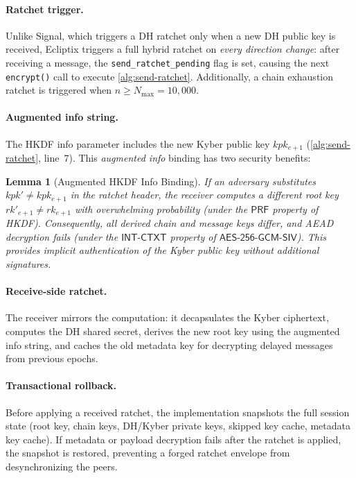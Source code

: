 \documentclass[11pt,a4paper]{article}
\newtheorem{lemma}[theorem]{Lemma}
\theoremstyle{definition}
\newcommand{\AEAD}{\textsf{AES-256-GCM-SIV}}
\newcommand{\INTCTXT}{\textsf{INT-CTXT}}
\newcommand{\PRF}{\textsf{PRF}}
\newcommand{\rk}{\mathit{rk}}
\begin{document}
\paragraph{Ratchet trigger.}
Unlike Signal, which triggers a DH ratchet only when a new DH public key is received, Ecliptix triggers a full hybrid ratchet on \emph{every direction change}: after receiving a message, the \texttt{send\_ratchet\_pending} flag is set, causing the next \texttt{encrypt()} call to execute \cref{alg:send-ratchet}. Additionally, a chain exhaustion ratchet is triggered when $n \geq N_{\max} = 10{,}000$.

\paragraph{Augmented info string.}
The HKDF info parameter includes the new Kyber public key $kpk_{e+1}$ (\cref{alg:send-ratchet}, line~7). This \emph{augmented info} binding has two security benefits:

\begin{lemma}[Augmented HKDF Info Binding]\label{lem:augmented-hkdf}
If an adversary substitutes $kpk' \neq kpk_{e+1}$ in the ratchet header, the receiver computes a different root key $\rk'_{e+1} \neq \rk_{e+1}$ with overwhelming probability (under the $\PRF$ property of HKDF). Consequently, all derived chain and message keys differ, and AEAD decryption fails (under the $\INTCTXT$ property of $\AEAD$). This provides implicit authentication of the Kyber public key without additional signatures.
\end{lemma}

\paragraph{Receive-side ratchet.}
The receiver mirrors the computation: it decapsulates the Kyber ciphertext, computes the DH shared secret, derives the new root key using the augmented info string, and caches the old metadata key for decrypting delayed messages from previous epochs.

\paragraph{Transactional rollback.}
Before applying a received ratchet, the implementation snapshots the full session state (root key, chain keys, DH/Kyber private keys, skipped key cache, metadata key cache). If metadata or payload decryption fails after the ratchet is applied, the snapshot is restored, preventing a forged ratchet envelope from desynchronizing the peers.
\end{document}
